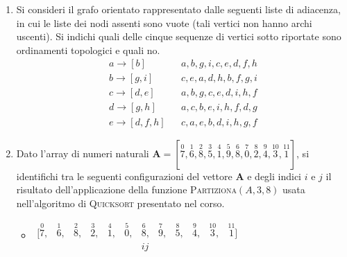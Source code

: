 \begin{enumerate}
\begin{enumerate}
\begin{minipage}{.2\textwidth}
	\end{minipage}
	\item Si consideri il grafo orientato rappresentato dalle seguenti liste di adiacenza, in cui le liste dei nodi assenti sono vuote (tali vertici non hanno archi uscenti). Si indichi quali delle cinque sequenze di vertici sotto riportate sono ordinamenti topologici e quali no.
	\begin{displaymath}
		\begin{array}{lll}
			a \rightarrow [b] & & a,b,g,i,c,e,d,f,h \\
			b \rightarrow [g,i] & & c,e,a,d,h,b,f,g,i \\
			c \rightarrow [d,e] & & a,b,g,c,e,d,i,h,f \\
			d \rightarrow [g,h] & & a,c,b,e,i,h,f,d,g \\
			e \rightarrow [d,f,h] & & c,a,e,b,d,i,h,g,f
		\end{array}
	\end{displaymath}
	\item Dato l'array di numeri naturali $\mathbf{A} = [\stackrel{0}{7},\stackrel{1}{6},\stackrel{2}{8},\stackrel{3}{5},\stackrel{4}{1},\stackrel{5}{9},\stackrel{6}{8},\stackrel{7}{0},\stackrel{8}{2},\stackrel{9}{4},\stackrel{10}{3},\stackrel{11}{1}]$, si identifichi tra le seguenti configurazioni del vettore $\mathbf{A}$ e degli indici $i$ e $j$ il risultato dell'applicazione della funzione \textsc{Partiziona}$(A,3,8)$ usata nell'algoritmo di \textsc{Quicksort} presentato nel corso.
	\begin{itemize}
		\item $
		\begin{array}{cccccccccccc}
			[\stackrel{0}{7}, &
			\stackrel{1}{6}, &
			\stackrel{2}{8}, &
			\stackrel{3}{2}, &
			\stackrel{4}{1}, &
			\stackrel{5}{0}, &
			\stackrel{6}{8}, &
			\stackrel{7}{9}, &
			\stackrel{8}{5}, &
			\stackrel{9}{4}, &
			\stackrel{10}{3}, &
			\stackrel{11}{1}] \\
			 & %
			 & %
			 & %
			 & %
			 & %
			 & %
			 i j& %
			 & %
			 & %
			 & %
			 & %
		\end{array}$

\end{itemize}
\end{enumerate}
\end{enumerate}
